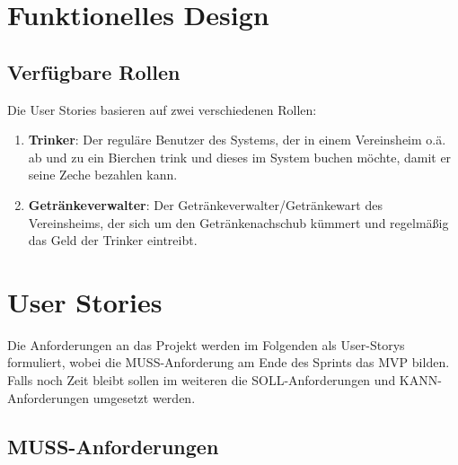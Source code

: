 \documentclass[conference,a4paper]{cs-techrep}
\begin{document}
\section{Funktionelles Design}
\subsection{Verfügbare Rollen}
Die User Stories basieren auf zwei verschiedenen Rollen:
\begin{enumerate}
\item \textbf{Trinker}: 
Der reguläre Benutzer des Systems, der in einem Vereinsheim o.ä. ab und zu ein Bierchen trink und dieses im System buchen möchte, damit er seine Zeche bezahlen kann.
\item \textbf{Getränkeverwalter}: 
Der Getränkeverwalter/Getränkewart des Vereinsheims, der sich um den Getränkenachschub kümmert und regelmäßig das Geld der Trinker eintreibt.
\end{enumerate}

\section{User Stories}

Die Anforderungen an das Projekt werden im Folgenden als User-Storys formuliert, wobei die MUSS-Anforderung am Ende des Sprints das MVP bilden. Falls noch Zeit bleibt sollen im weiteren die SOLL-Anforderungen und KANN-Anforderungen umgesetzt werden.

\subsection{MUSS-Anforderungen}
\end{document}
